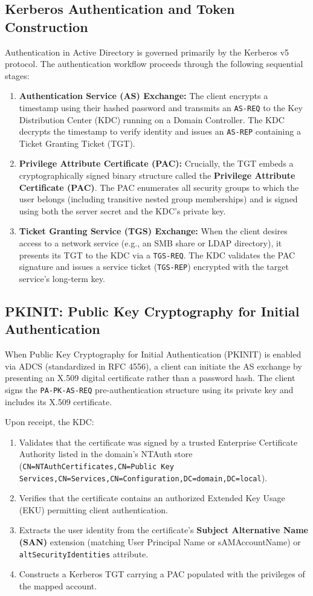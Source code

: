 \subsection{Kerberos Authentication and Token Construction}
Authentication in Active Directory is governed primarily by the Kerberos v5 protocol. The authentication workflow proceeds through the following sequential stages:
\begin{enumerate}
    \item \textbf{Authentication Service (AS) Exchange:} The client encrypts a timestamp using their hashed password and transmits an \texttt{AS-REQ} to the Key Distribution Center (KDC) running on a Domain Controller. The KDC decrypts the timestamp to verify identity and issues an \texttt{AS-REP} containing a Ticket Granting Ticket (TGT).
    \item \textbf{Privilege Attribute Certificate (PAC):} Crucially, the TGT embeds a cryptographically signed binary structure called the \textbf{Privilege Attribute Certificate (PAC)}. The PAC enumerates all security groups to which the user belongs (including transitive nested group memberships) and is signed using both the server secret and the KDC's private key.
    \item \textbf{Ticket Granting Service (TGS) Exchange:} When the client desires access to a network service (e.g., an SMB share or LDAP directory), it presents its TGT to the KDC via a \texttt{TGS-REQ}. The KDC validates the PAC signature and issues a service ticket (\texttt{TGS-REP}) encrypted with the target service's long-term key.
\end{enumerate}

\subsection{PKINIT: Public Key Cryptography for Initial Authentication}
When Public Key Cryptography for Initial Authentication (PKINIT) is enabled via ADCS (standardized in RFC 4556), a client can initiate the AS exchange by presenting an X.509 digital certificate rather than a password hash. The client signs the \texttt{PA-PK-AS-REQ} pre-authentication structure using its private key and includes its X.509 certificate.

Upon receipt, the KDC:
\begin{enumerate}
    \item Validates that the certificate was signed by a trusted Enterprise Certificate Authority listed in the domain's NTAuth store (\nolinkurl{CN=NTAuthCertificates,CN=Public Key Services,CN=Services,CN=Configuration,DC=domain,DC=local}).
    \item Verifies that the certificate contains an authorized Extended Key Usage (EKU) permitting client authentication.
    \item Extracts the user identity from the certificate's \textbf{Subject Alternative Name (SAN)} extension (matching User Principal Name or sAMAccountName) or \texttt{altSecurityIdentities} attribute.
    \item Constructs a Kerberos TGT carrying a PAC populated with the privileges of the mapped account.
\end{enumerate}

